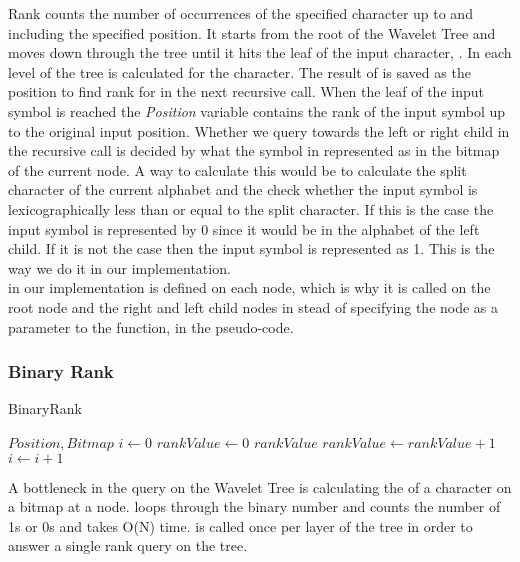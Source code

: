 Rank counts the number of occurrences of the specified character up to and including the specified position. 
It starts from the root of the Wavelet Tree and moves down through the tree until it hits the leaf of the input character, \citep[Section 2.2]{Claude08practicalrankselect}. 
In each level of the tree  is calculated for the character. 
The result of  is saved as the position to find rank for in the next recursive call. 
When the leaf of the input symbol is reached the \textit{Position} variable contains the rank of the input symbol up to the original input position.
Whether we query towards the left or right child in the recursive call is decided by what the symbol in represented as in the bitmap of the current node.
A way to calculate this would be to calculate the split character of the current alphabet and the check whether the input symbol is lexicographically less than or equal to the split character. 
If this is the case the input symbol is represented by 0 since it would be in the alphabet of the left child.
If it is not the case then the input symbol is represented as 1.
This is the way we do it in our implementation. \\

 in our implementation is defined on each node, which is why it is called on the root node and the right and left child nodes in stead of specifying the node as a parameter to the  function, in the pseudo-code.

\subsubsection{Binary Rank} 
\label{sec:TheoryBinaryRank}
\begin{algorithm}
\caption{BinaryRank}
\label{alg:binaryrank}
\begin{algorithmic}
 {$Position, Bitmap$}
\State $i \gets 0$
\State $rankValue \gets 0$
\State \Return $rankValue$
\EndIf
{}
\State $rankValue \gets rankValue + 1$
\EndIf
\State $i \gets i + 1$
\EndFor
\EndFunction
\end{algorithmic}
\end{algorithm}
A bottleneck in the  query on the Wavelet Tree is calculating the  of a character on a bitmap at a node.
 loops through the binary number and counts the number of 1s or 0s and takes O(N) time.  is called once per layer of the tree in order to answer a single rank query on the tree. 

